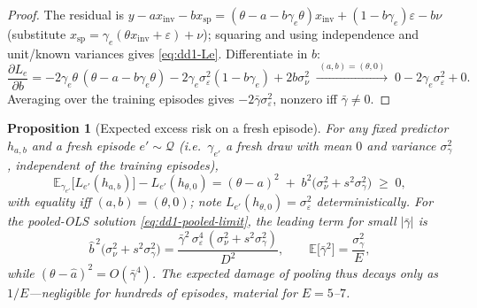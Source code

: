 \documentclass[11pt,a4paper]{article}
\theoremstyle{definition}
\theoremstyle{plain}
\newtheorem{proposition}{Proposition}[section]
\newcommand{\E}{\mathbb{E}}
\begin{document}
\begin{proof}
The residual is $y - a x_{\mathrm{inv}} - b x_{\mathrm{sp}}
= (\theta - a - b\gamma_e \theta) x_{\mathrm{inv}} + (1 - b\gamma_e)
\varepsilon - b \nu$ (substitute $x_{\mathrm{sp}} = \gamma_e(\theta
x_{\mathrm{inv}} + \varepsilon) + \nu$); squaring and using independence and
unit/known variances gives \eqref{eq:dd1-Le}. Differentiate in $b$:
\[
\frac{\partial L_e}{\partial b}
= -2\gamma_e\theta\,(\theta - a - b\gamma_e\theta)
- 2\gamma_e \sigma_\varepsilon^2 (1 - b\gamma_e) + 2 b \sigma_\nu^2
\;\xrightarrow{\;(a,b) = (\theta, 0)\;}\;
0 - 2\gamma_e \sigma_\varepsilon^2 + 0 .
\]
Averaging over the training episodes gives $-2\bar\gamma
\sigma_\varepsilon^2$, nonzero iff $\bar\gamma \neq 0$.
\end{proof}

\begin{proposition}[Expected excess risk on a fresh episode]
\label{prop:dd1-excess}
For any fixed predictor $h_{a,b}$ and a fresh episode $e' \sim \mathcal{Q}$
(i.e.\ $\gamma_{e'}$ a fresh draw with mean $0$ and variance
$\sigma_\gamma^2$, independent of the training episodes),
\begin{equation}
\label{eq:dd1-excess}
\E_{\gamma_{e'}}\bigl[ L_{e'}(h_{a,b}) \bigr] - L_{e'}(h_{\theta, 0})
= (\theta - a)^2 \;+\; b^2 \bigl( \sigma_\nu^2 + s^2 \sigma_\gamma^2 \bigr)
\;\ge\; 0,
\end{equation}
with equality iff $(a,b) = (\theta, 0)$; note $L_{e'}(h_{\theta,0}) =
\sigma_\varepsilon^2$ deterministically. For the pooled-OLS solution
\eqref{eq:dd1-pooled-limit}, the leading term for small $|\bar\gamma|$ is
\begin{equation}
\label{eq:dd1-excess-rate}
\widehat{b}^{\,2}\bigl( \sigma_\nu^2 + s^2\sigma_\gamma^2 \bigr)
= \frac{\bar{\gamma}^2\, \sigma_\varepsilon^4 \,(\sigma_\nu^2 +
s^2\sigma_\gamma^2)}{D^2},
\qquad
\E\bigl[\bar{\gamma}^2\bigr] = \frac{\sigma_\gamma^2}{E},
\end{equation}
while $(\theta - \widehat a)^2 = O(\bar\gamma^4)$. The expected damage of
pooling thus decays only as $1/E$---negligible for hundreds of episodes,
material for $E = 5$--$7$.
\end{proposition}
\end{document}
